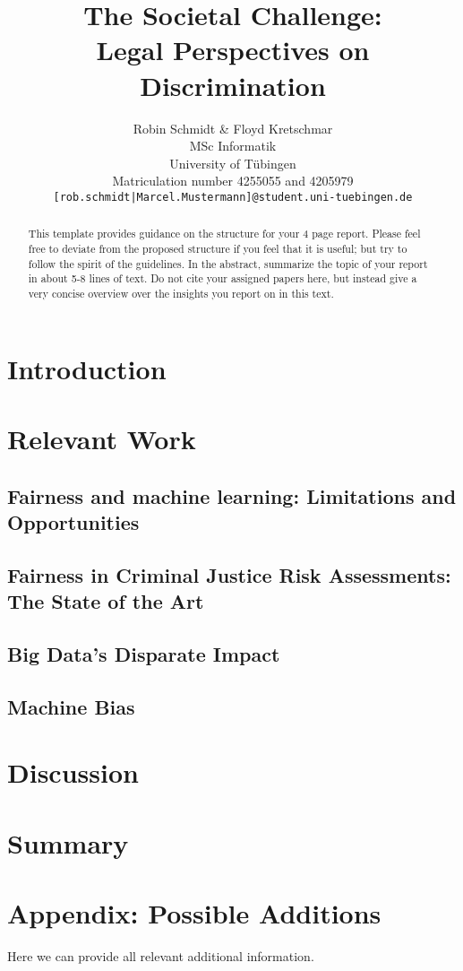 \documentclass{article}
\title{The Societal Challenge: \\ Legal Perspectives on Discrimination}
\author{%
  Robin Schmidt \& Floyd Kretschmar\\
  MSc Informatik \\
  University of Tübingen\\
  Matriculation number 4255055 and 4205979\\
  \texttt{[rob.schmidt|Marcel.Mustermann]@student.uni-tuebingen.de}
}
\begin{document}
\maketitle

\begin{abstract}
  This template provides guidance on the structure for your 4 page report. Please feel free to deviate from the proposed structure if you feel that it is useful; but try to follow the spirit of the guidelines.
  In the abstract, summarize the topic of your report in about 5-8 lines of text. Do not cite your assigned papers here, but instead give a very concise overview over the insights you report on in this text.
\end{abstract}

\section{Introduction} \label{Introduction}

\section{Relevant Work}

\subsection{Fairness and machine learning: Limitations and Opportunities}


\subsection{Fairness in Criminal Justice Risk Assessments: The State of the Art}


\subsection{Big Data’s Disparate Impact}


\subsection{Machine Bias}


\section{Discussion}


\section{Summary}


\section{Appendix: Possible Additions}
Here we can provide all relevant additional information.

\medskip
\small


\end{document}
